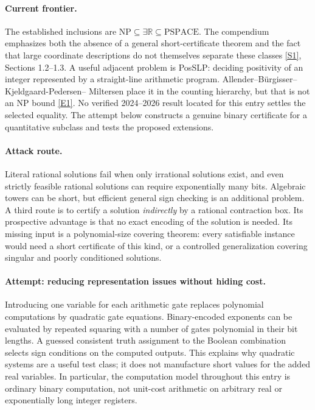\documentclass[11pt,a4paper]{article}
\newcommand{\R}{\mathbb{R}}
\newcommand{\sref}[2]{\hyperlink{source:#1:#2}{[S#2]}}
\newcommand{\eref}[2]{\hyperlink{extra:#1:#2}{[E#2]}}
\numberwithin{equation}{section}
\begin{document}
\paragraph{Current frontier.}
The established inclusions are
$\mathrm{NP}\subseteq\exists\R\subseteq\mathrm{PSPACE}$. The compendium
emphasizes both the absence of a general short-certificate theorem and the
fact that large coordinate descriptions do not themselves separate these
classes \sref{statement}{1}, Sections 1.2--1.3. A useful adjacent problem is
\textsf{PosSLP}: deciding positivity of an integer represented by a
straight-line arithmetic program. Allender--B\"urgisser--Kjeldgaard-Pedersen--
Miltersen place it in the counting hierarchy, but that is not an NP bound
\eref{statement}{1}. No verified 2024--2026 result located for this entry settles
the selected equality. The attempt below constructs a genuine binary
certificate for a quantitative subclass and tests the proposed extensions.

\paragraph{Attack route.}
Literal rational solutions fail when only irrational solutions exist, and
even strictly feasible rational solutions can require exponentially many
bits. Algebraic towers can be short, but efficient general sign checking
is an additional problem. A third route is to certify a solution
\emph{indirectly} by a rational contraction box. Its prospective advantage
is that no exact encoding of the solution is needed. Its missing input is
a polynomial-size covering theorem: every satisfiable instance would need
a short certificate of this kind, or a controlled generalization covering
singular and poorly conditioned solutions.

\paragraph{Attempt: reducing representation issues without hiding cost.}
Introducing one variable for each arithmetic gate replaces polynomial
computations by quadratic gate equations. Binary-encoded exponents can be
evaluated by repeated squaring with a number of gates polynomial in their
bit lengths. A guessed consistent truth assignment to the Boolean
combination selects sign conditions on the computed outputs. This explains
why quadratic systems are a useful test class; it does not manufacture
short values for the added real variables. In particular, the computation
model throughout this entry is ordinary binary computation, not unit-cost
arithmetic on arbitrary real or exponentially long integer registers.
\end{document}
